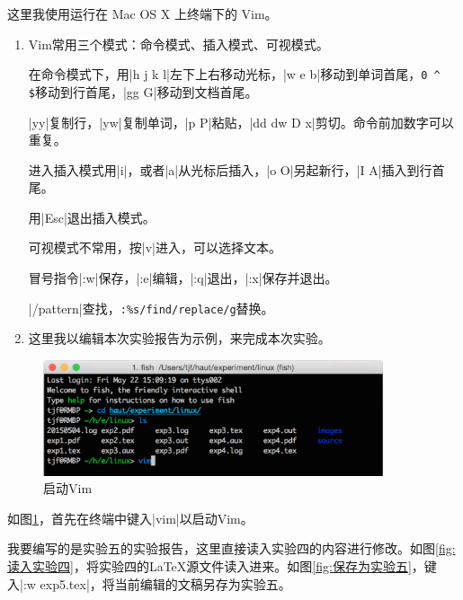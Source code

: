 \documentclass[cs4size,a4paper,nofonts]{ctexart}
\begin{document}
这里我使用运行在 Mac OS X 上终端下的 Vim。

\begin{enumerate}

\item Vim常用三个模式：命令模式、插入模式、可视模式。

在命令模式下，用|h j k l|左下上右移动光标，|w e b|移动到单词首尾，\verb+0 ^ $+移动到行首尾，|gg G|移动到文档首尾。

|yy|复制行，|yw|复制单词，|p P|粘贴，|dd dw D x|剪切。命令前加数字可以重复。

进入插入模式用|i|，或者|a|从光标后插入，|o O|另起新行，|I A|插入到行首尾。

用|Esc|退出插入模式。

可视模式不常用，按|v|进入，可以选择文本。

冒号指令|:w|保存，|:e|编辑，|:q|退出，|:x|保存并退出。

|/pattern|查找，\verb+:%s/find/replace/g+替换。

\item 这里我以编辑本次实验报告为示例，来完成本次实验。

\end{enumerate}

\begin{figure}[htp]
\centering
\includegraphics[width=10cm]{images/exp5/1.start.png}
\caption{启动Vim}
\label{fig:启动Vim}
\end{figure}

如图\ref{fig:启动Vim}，首先在终端中键入|vim|以启动Vim。

\begin{figure}[htp]
\end{figure}

我要编写的是实验五的实验报告，这里直接读入实验四的内容进行修改。如图\ref{fig:读入实验四}，将实验四的\LaTeX 源文件读入进来。如图\ref{fig:保存为实验五}，键入|:w exp5.tex|，将当前编辑的文稿另存为实验五。

\begin{figure}[htp]
\end{figure}
\end{document}
